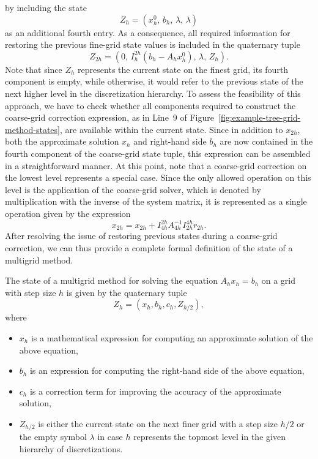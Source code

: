 by including the state 
\begin{equation*}
Z_h = (x_{h}^0, \, b_h, \, \lambda, \, \lambda) 
\end{equation*} 
as an additional fourth entry. 
As a consequence, all required information for restoring the previous fine-grid state values is included in the quaternary tuple 
\begin{equation*}
	Z_{2h} = (0, \, I_{h}^{2h}(b_{h} - A_h x_{h}^0), \, \lambda, \, Z_h).
\end{equation*}
Note that since $Z_h$ represents the current state on the finest grid, its fourth component is empty, while otherwise, it would refer to the previous state of the next higher level in the discretization hierarchy.
To assess the feasibility of this approach, we have to check whether all components required to construct the coarse-grid correction expression, as in Line~9 of Figure~\ref{fig:example-tree-grid-method-states}, are available within the current state.
Since in addition to $x_{2h}$, both the approximate solution $x_h$ and right-hand side $b_h$ are now contained in the fourth component of the coarse-grid state tuple, this expression can be assembled in a straightforward manner.
At this point, note that a coarse-grid correction on the lowest level represents a special case. 
Since the only allowed operation on this level is the application of the coarse-grid solver, which is denoted by multiplication with the inverse of the system matrix, it is represented as a single operation given by the expression 
\begin{equation*}
	x_{2h} = x_{2h} + I_{4h}^{2h} A_{4h}^{-1} I_{2h}^{4h} r_{2h}.
\end{equation*}
After resolving the issue of restoring previous states during a coarse-grid correction, we can thus provide a complete formal definition of the state of a multigrid method.
\begin{definition}
\label{def:multigrid-state}
The state of a multigrid method for solving the equation $A_{h} x_{h} = b_{h}$ on a grid with step size $h$ is given by the quaternary tuple
\begin{equation}
	Z_{h} = \left( x_{h}, b_{h}, c_{h}, Z_{h/2}\right), 
\end{equation}
where
\begin{itemize}
	\item $x_{h}$ is a mathematical expression for computing an approximate solution of the above equation,
	\item $b_{h}$ is an expression for computing the right-hand side of the above equation,
	\item $c_{h}$ is a correction term for improving the accuracy of the approximate solution,
	\item $Z_{h/2}$ is either the current state on the next finer grid with a step size $h/2$ or the empty symbol $\lambda$ in case $h$ represents the topmost level in the given hierarchy of discretizations.
\end{itemize}
\end{definition}
